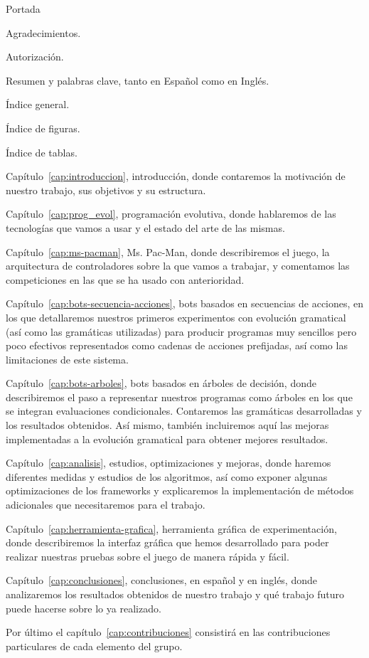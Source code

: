 Portada

Agradecimientos.

Autorización.

Resumen y palabras clave, tanto en Español como en Inglés.

Índice general.

Índice de figuras.

Índice de tablas.

Capítulo~\ref{cap:introduccion}, introducción, donde contaremos la motivación de nuestro trabajo, sus objetivos y su estructura.

Capítulo~\ref{cap:prog_evol}, programación evolutiva, donde hablaremos de las tecnologías que vamos a usar y el estado del arte de las mismas.

Capítulo~\ref{cap:ms-pacman}, Ms. Pac-Man, donde describiremos el juego, la arquitectura de controladores sobre la que vamos a trabajar, y comentamos las competiciones en las que se ha usado con anterioridad.

Capítulo~\ref{cap:bots-secuencia-acciones}, bots basados en secuencias de acciones, en los que detallaremos nuestros primeros experimentos con evolución gramatical (así como las gramáticas utilizadas) para producir programas muy sencillos pero poco efectivos representados como cadenas de acciones prefijadas, así como las limitaciones de este sistema.

Capítulo~\ref{cap:bots-arboles}, bots basados en árboles de decisión, donde describiremos el paso a representar nuestros programas como árboles en los que se integran evaluaciones condicionales. Contaremos las gramáticas desarrolladas y los resultados obtenidos. Así mismo, también incluiremos aquí las mejoras implementadas a la evolución gramatical para obtener mejores resultados.

Capítulo~\ref{cap:analisis}, estudios, optimizaciones y mejoras, donde haremos diferentes medidas y estudios de los algoritmos, así como exponer algunas optimizaciones de los frameworks y explicaremos la implementación de métodos adicionales que necesitaremos para el trabajo.

Capítulo~\ref{cap:herramienta-grafica}, herramienta gráfica de experimentación, donde describiremos la interfaz gráfica que hemos desarrollado para poder realizar nuestras pruebas sobre el juego de manera rápida y fácil.

Capítulo~\ref{cap:conclusiones}, conclusiones, en español y en inglés, donde analizaremos los resultados obtenidos de nuestro trabajo y qué trabajo futuro puede hacerse sobre lo ya realizado. 

Por último el capítulo~\ref{cap:contribuciones} consistirá en las contribuciones particulares de cada elemento del grupo.
